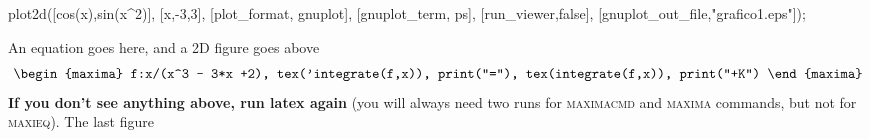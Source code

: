 \documentclass[a4paper,11pt]{article}
\numberwithin{equation}{section}
\begin{document}
\begin{maximacmd}
   plot2d([cos(x),sin(x^2)], [x,-3,3],
          [plot_format, gnuplot],
          [gnuplot_term, ps],
          [run_viewer,false],
          [gnuplot_out_file,"grafico1.eps"]);
\end{maximacmd}

An equation goes here, and a 2D figure goes above
\[
 \begin{maxima}
 f:x/(x^3 - 3*x +2),
 tex('integrate(f,x)),
 print("="),
 tex(integrate(f,x)),
 print("+K")
 \end{maxima}
\]
\textbf{If you don't see anything above, run latex again} (you will always
need two runs for \textsc{maximacmd} and \textsc{maxima} commands, but
not for \textsc{maxieq}). The last figure
\end{document}
